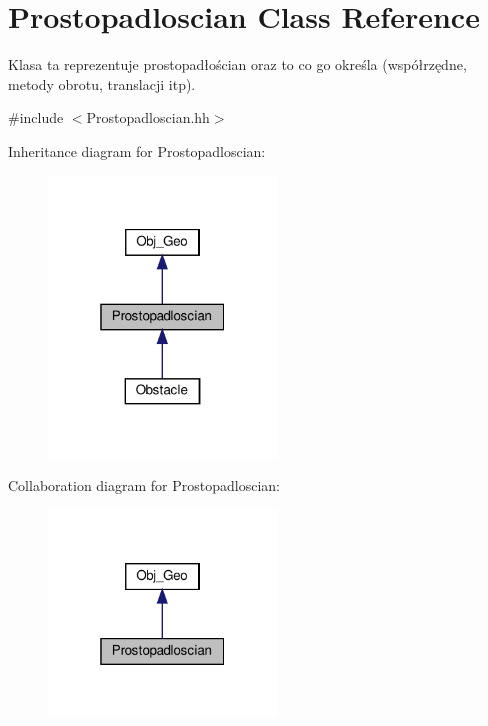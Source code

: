 \hypertarget{class_prostopadloscian}{}\section{Prostopadloscian Class Reference}
\label{class_prostopadloscian}


Klasa ta reprezentuje prostopadłościan oraz to co go określa (współrzędne, metody obrotu, translacji itp).  




{\ttfamily \#include $<$Prostopadloscian.\+hh$>$}



Inheritance diagram for Prostopadloscian\+:
\nopagebreak
\begin{figure}[H]
\begin{center}
\leavevmode
\includegraphics[width=172pt]{class_prostopadloscian__inherit__graph}
\end{center}
\end{figure}


Collaboration diagram for Prostopadloscian\+:
\nopagebreak
\begin{figure}[H]
\begin{center}
\leavevmode
\includegraphics[width=172pt]{class_prostopadloscian__coll__graph}
\end{center}
\end{figure}
